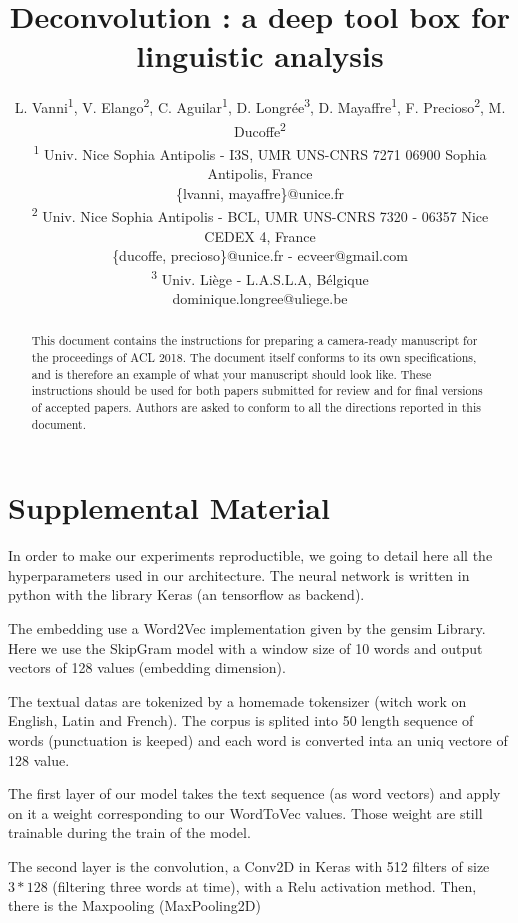 \documentclass[11pt,a4paper]{article}
\title{Deconvolution : a deep tool box for linguistic analysis}
\author{
L. Vanni\textsuperscript{1}, V. Elango\textsuperscript{2}, C. Aguilar\textsuperscript{1}, D. Longrée\textsuperscript{3}, D. Mayaffre\textsuperscript{1}, F. Precioso\textsuperscript{2}, M. Ducoffe\textsuperscript{2}\\
  \textsuperscript{1} Univ. Nice Sophia Antipolis - I3S, UMR UNS-CNRS 7271 06900 Sophia Antipolis, France \\
  \{lvanni, mayaffre\}@unice.fr \\
  \textsuperscript{2} Univ. Nice Sophia Antipolis - BCL, UMR UNS-CNRS 7320 - 06357 Nice CEDEX 4, France \\
  \{ducoffe, precioso\}@unice.fr - ecveer@gmail.com \\
  \textsuperscript{3} Univ. Liège - L.A.S.L.A, Bélgique \\
  dominique.longree@uliege.be\\}
\date{}
\begin{document}
\maketitle
\begin{abstract}
  This document contains the instructions for preparing a camera-ready
  manuscript for the proceedings of ACL 2018. The document itself
  conforms to its own specifications, and is therefore an example of
  what your manuscript should look like. These instructions should be
  used for both papers submitted for review and for final versions of
  accepted papers.  Authors are asked to conform to all the directions
  reported in this document.
\end{abstract}











%
%

\appendix

\section{Supplemental Material}
\label{sec:supplemental}

In order to make our experiments reproductible, we going to detail here all the hyperparameters used in our architecture. The neural network is written in python with the library Keras (an tensorflow as backend). 

The embedding use a Word2Vec implementation given by the gensim Library. Here we use the SkipGram model with a window size of 10 words and output vectors of 128 values (embedding dimension).

The textual datas are tokenized by a homemade tokensizer (witch work on English, Latin and French). The corpus is splited into 50 length sequence of words (punctuation is keeped) and each word is converted inta an uniq vectore of 128 value.

The first layer of our model takes the text sequence (as word vectors) and apply on it a weight corresponding to our WordToVec values. Those weight are still trainable during the train of the model.

The second layer is the convolution, a Conv2D in Keras with 512 filters of size $3*128$ (filtering three words at time), with a Relu activation method. Then, there is the Maxpooling (MaxPooling2D) 
\end{document}
